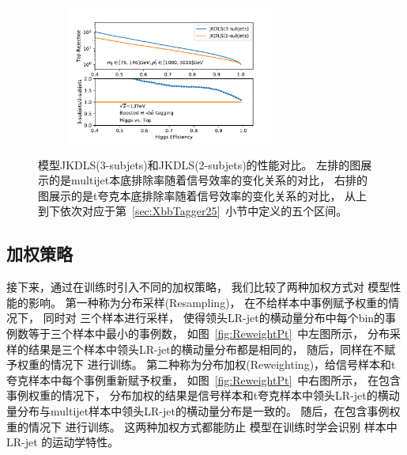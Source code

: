 \begin{figure}[htbp]
\begin{subfigure}{.5\textwidth}
     \caption{}
  \end{subfigure}
  \begin{subfigure}{.5\textwidth}
  \centering
   \includegraphics[width=0.75\textwidth]{figuresXbb/Subjet/SUBTopMASSPT3.pdf}
     \caption{}
  \end{subfigure}
  \caption{
 模型JKDLS(3-subjets)和JKDLS(2-subjets)的性能对比。
左排的图展示的是multijet本底排除率随着信号效率的变化关系的对比，
右排的图展示的是t夸克本底排除率随着信号效率的变化关系的对比，
从上到下依次对应于第~\ref{sec:XbbTagger25}~小节中定义的五个区间。
  }
  \label{fig:SubjetROC}
\end{figure} 


\subsection{加权策略}
\label{sec:XbbTagger3}

接下来，通过在训练时引入不同的加权策略，
我们比较了两种加权方式对
模型性能的影响。
第一种称为分布采样(Resampling)，
在不给样本中事例赋予权重的情况下，
同时对
三个样本进行采样，
使得领头LR-jet的横动量分布中每个bin的事例数等于三个样本中最小的事例数，
如图~\ref{fig:ReweightPt}~中左图所示，
分布采样的结果是三个样本中领头LR-jet的横动量分布都是相同的，
随后，同样在不赋予权重的情况下
进行训练。
第二种称为分布加权(Reweighting)，给信号样本和t夸克样本中每个事例重新赋予权重，
如图~\ref{fig:ReweightPt}~中右图所示，
在包含事例权重的情况下，
分布加权的结果是信号样本和t夸克样本中领头LR-jet的横动量分布与multijet样本中领头LR-jet的横动量分布是一致的。
随后，在包含事例权重的情况下
进行训练。
这两种加权方式都能防止
模型在训练时学会识别
样本中LR-jet
的运动学特性。

